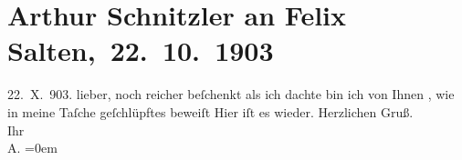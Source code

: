 

         
         \renewcommand{\erwaehntePersonen}{Personen: Felix Salten}
         \renewcommand{\erwaehnteOrte}{Orte: Wien}
         \renewcommand{\erwaehnteWerke}{}
               \section[ Arthur Schnitzler an Felix Salten, 22. 10. 1903]{ Arthur Schnitzler an Felix Salten, 22. 10. 1903}\nopagebreak{}\rehead{ }\begin{ledgroupsized}[t]{13cm}\normalsize\beginnumbering \toendnotes[C]{\smallbreak\pagebreak[2]} 
\toendnotes[C]{\smallbreak}\pstart
           \raggedleft{}{\pb}22. X. 903.\pend
           \pstart
           lieber, noch reicher beſchenkt als ich dachte bin ich von Ihnen
                  \label{K_L02987-1v}\label{K_L02987-1h}, wie \label{K_L02987-2v}\label{K_L02987-2h} in meine
               Taſche geſchlüpftes beweiſt\pend
           \pstart
           Hier iſt es wieder.\pend
           \pstart
           Herzlichen Gruß. {\\[\baselineskip]}Ihr {\\[\baselineskip]}\spacefill\mbox{A.}\pend
           \leftskip=0em{}
         
         \endnumbering{}\end{ledgroupsized}  \newcommand{\dateiname}{L02987}\newcommand{\titel}{Arthur Schnitzler an Felix Salten, 22. 10. 1903}\newcommand{\editorInnen}{Martin Anton Müller und Laura Untner}
      